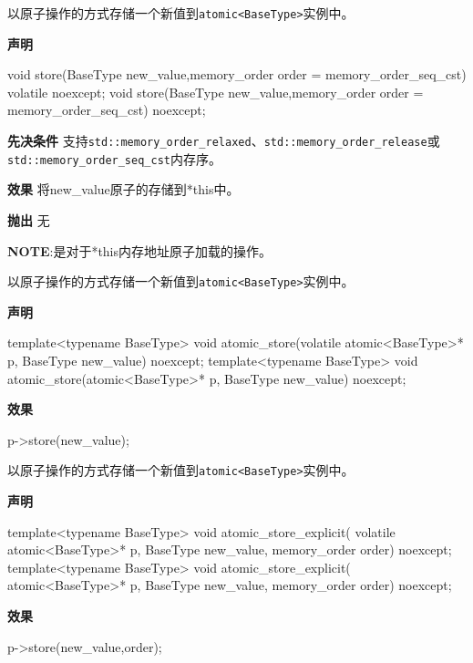 以原子操作的方式存储一个新值到\texttt{atomic<BaseType>}实例中。

\textbf{声明}

\begin{cpp}
void store(BaseType new_value,memory_order order = memory_order_seq_cst)
    volatile noexcept;
void store(BaseType new_value,memory_order order = memory_order_seq_cst)
    noexcept;
\end{cpp}

\textbf{先决条件}
支持\texttt{std::memory\_order\_relaxed}、\texttt{std::memory\_order\_release}或\texttt{std::memory\_order\_seq\_cst}内存序。

\textbf{效果}
将new\_value原子的存储到*this中。

\textbf{抛出}
无

\textbf{NOTE}:是对于*this内存地址原子加载的操作。


以原子操作的方式存储一个新值到\texttt{atomic<BaseType>}实例中。

\textbf{声明}

\begin{cpp}
template<typename BaseType>
void atomic_store(volatile atomic<BaseType>* p, BaseType new_value)
    noexcept;
template<typename BaseType>
void atomic_store(atomic<BaseType>* p, BaseType new_value) noexcept;
\end{cpp}

\textbf{效果}

\begin{cpp}
p->store(new_value);
\end{cpp}


以原子操作的方式存储一个新值到\texttt{atomic<BaseType>}实例中。

\textbf{声明}

\begin{cpp}
template<typename BaseType>
void atomic_store_explicit(
    volatile atomic<BaseType>* p, BaseType new_value, memory_order order)
    noexcept;
template<typename BaseType>
void atomic_store_explicit(
    atomic<BaseType>* p, BaseType new_value, memory_order order) noexcept;
\end{cpp}

\textbf{效果}

\begin{cpp}
p->store(new_value,order);
\end{cpp}


